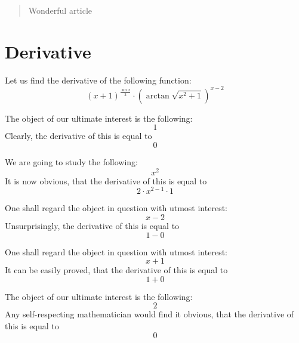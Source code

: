 \documentclass{article}
\begin{document}
\maketitle
\begin{abstract}
Wonderful article
\end{abstract}
\newpage
\section{Derivative}
Let us find the derivative of the following function:
\begin{equation}
\left( x + 1 \right) ^{\frac{\sin x }{2 } } \cdot \left( \arctan \sqrt {x ^{2 } + 1 } \right) ^{x - 2 } 
\end{equation}

The object of our ultimate interest is the following:
\begin{equation}
1 
\end{equation}
Clearly, the derivative of this is equal to
\begin{equation}
0 
\end{equation}

We are going to study the following:
\begin{equation}
x ^{2 } 
\end{equation}
It is now obvious, that the derivative of this is equal to
\begin{equation}
2 \cdot x ^{2 - 1 } \cdot 1 
\end{equation}

One shall regard the object in question with utmost interest:
\begin{equation}
x - 2 
\end{equation}
Unsurprisingly, the derivative of this is equal to
\begin{equation}
1 - 0 
\end{equation}

One shall regard the object in question with utmost interest:
\begin{equation}
x + 1 
\end{equation}
It can be easily proved, that the derivative of this is equal to
\begin{equation}
1 + 0 
\end{equation}

The object of our ultimate interest is the following:
\begin{equation}
2 
\end{equation}
Any self-respecting mathematician would find it obvious, that the derivative of this is equal to
\begin{equation}
0 
\end{equation}
\end{document}

